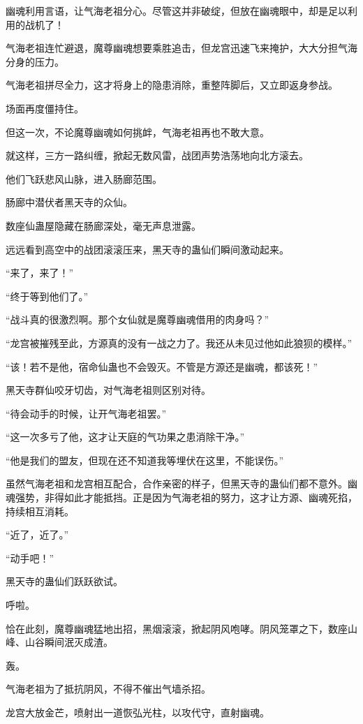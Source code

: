 \begin{this_body}
幽魂利用言语，让气海老祖分心。尽管这并非破绽，但放在幽魂眼中，却是足以利用的战机了！

气海老祖连忙避退，魔尊幽魂想要乘胜追击，但龙宫迅速飞来掩护，大大分担气海分身的压力。

气海老祖拼尽全力，这才将身上的隐患消除，重整阵脚后，又立即返身参战。

场面再度僵持住。

但这一次，不论魔尊幽魂如何挑衅，气海老祖再也不敢大意。

就这样，三方一路纠缠，掀起无数风雷，战团声势浩荡地向北方滚去。

他们飞跃悲风山脉，进入肠廊范围。

肠廊中潜伏者黑天寺的众仙。

数座仙蛊屋隐藏在肠廊深处，毫无声息泄露。

远远看到高空中的战团滚滚压来，黑天寺的蛊仙们瞬间激动起来。

“来了，来了！”

“终于等到他们了。”

“战斗真的很激烈啊。那个女仙就是魔尊幽魂借用的肉身吗？”

“龙宫被摧残至此，方源真的没有一战之力了。我还从未见过他如此狼狈的模样。”

“该！若不是他，宿命仙蛊也不会毁灭。不管是方源还是幽魂，都该死！”

黑天寺群仙咬牙切齿，对气海老祖则区别对待。

“待会动手的时候，让开气海老祖罢。”

“这一次多亏了他，这才让天庭的气功果之患消除干净。”

“他是我们的盟友，但现在还不知道我等埋伏在这里，不能误伤。”

虽然气海老祖和龙宫相互配合，合作亲密的样子，但黑天寺的蛊仙们都不意外。幽魂强势，非得如此才能抵挡。正是因为气海老祖的努力，这才让方源、幽魂死掐，持续相互消耗。

“近了，近了。”

“动手吧！”

黑天寺的蛊仙们跃跃欲试。

呼啦。

恰在此刻，魔尊幽魂猛地出招，黑烟滚滚，掀起阴风咆哮。阴风笼罩之下，数座山峰、山谷瞬间泯灭成渣。

轰。

气海老祖为了抵抗阴风，不得不催出气墙杀招。

龙宫大放金芒，喷射出一道恢弘光柱，以攻代守，直射幽魂。


\end{this_body}
